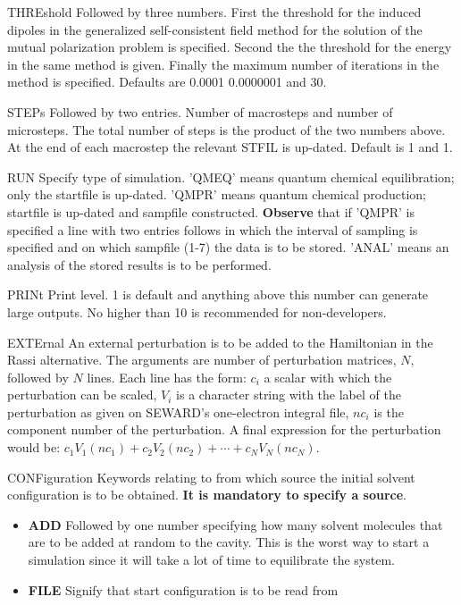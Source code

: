 \begin{keywordlist}
\begin{itemize}
\end{itemize}
\item[THREshold]
Followed by three numbers. First the threshold for the induced
dipoles in the generalized self-consistent field method for the solution
of the mutual polarization problem is specified. Second the the threshold
for the energy in the same method is given. Finally the maximum
number of iterations in the method is specified. Defaults are 0.0001 0.0000001
and 30.
\item[STEPs]
Followed by two entries. Number of macrosteps and number of microsteps.
The total number of steps is the product of the two numbers above. At
the end of each macrostep the relevant STFIL is up-dated. Default
is 1 and 1.
\item[RUN]
Specify type of simulation. 'QMEQ' means quantum chemical equilibration;
only the startfile is up-dated. 'QMPR' means quantum chemical
production; startfile is up-dated and sampfile constructed. {\bf Observe}
that if 'QMPR' is specified a line with two entries follows in which
the interval of sampling is specified and on which sampfile (1-7) the
data is to be stored. 'ANAL' means an analysis of the stored results
is to be performed.
\item[PRINt]
Print level. 1 is default and anything above this number can generate
large outputs. No higher than 10 is recommended for non-developers.
\item[EXTErnal]
An external perturbation is to be added to the Hamiltonian
in the Rassi alternative. The arguments are number of perturbation
matrices, $N$, followed by $N$ lines. Each line has the form: $c_i$ a scalar
with which the perturbation can be scaled, $V_i$ is a character string with
the label of the perturbation as given on SEWARD's one-electron integral file,
$nc_i$ is the component number of the perturbation.
A final expression for the perturbation would be: $c_1V_1(nc_1)+c_2V_2(nc_2)+\cdots+c_NV_N(nc_N)$.
\item[CONFiguration]
Keywords relating to from which source the initial solvent
configuration is to be obtained. {\bf It is mandatory to
specify a source}.
\begin{itemize}
\item {\bf ADD} Followed by one number specifying how many solvent
molecules that are to be added at random to the cavity. This is the
worst way to start a simulation since it will take a lot of time to
equilibrate the system.
\item {\bf FILE} Signify that start configuration is to be read from

\end{itemize}
\end{keywordlist}
